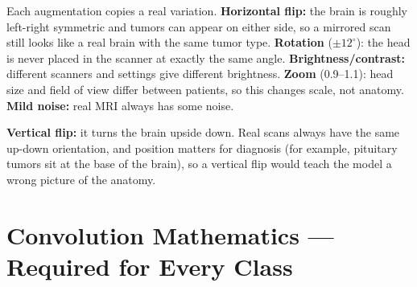 \documentclass[12pt,a4paper]{article}
\begin{document}
\begin{answerbox}
Each augmentation copies a real variation. \textbf{Horizontal flip:} the brain is roughly left-right
symmetric and tumors can appear on either side, so a mirrored scan still looks like a real brain with the
same tumor type. \textbf{Rotation} ($\pm12^\circ$): the head is never placed in the scanner at exactly the
same angle. \textbf{Brightness/contrast:} different scanners and settings give different brightness.
\textbf{Zoom} (0.9--1.1): head size and field of view differ between patients, so this changes scale, not anatomy.
\textbf{Mild noise:} real MRI always has some noise.\par
\textbf{Vertical flip:} it turns the brain upside down. Real scans always have the same up-down orientation,
and position matters for diagnosis (for example, pituitary tumors sit at the base of the brain), so a vertical
flip would teach the model a wrong picture of the anatomy.
\end{answerbox}

\section{Convolution Mathematics --- Required for Every Class}
\end{document}
